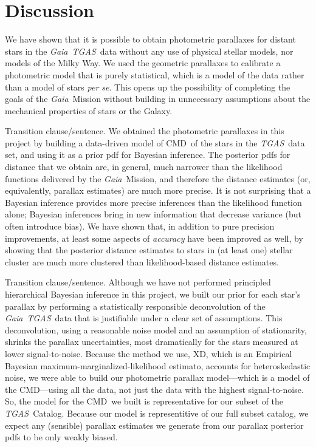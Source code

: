 \documentclass[modern]{aastex61}
\newcommand{\foreign}[1]{\textsl{#1}}
\newcommand{\acronym}[1]{{\small{#1}}}
\newcommand{\project}[1]{\textsl{#1}}
\newcommand{\tgas}{\project{\acronym{TGAS}}}
\newcommand{\gaia}{\project{Gaia}}
\newcommand{\xd}{\acronym{XD}}
\newcommand{\cmd}{\acronym{CMD}}
\begin{document}
\section{Discussion}

We have shown that it is possible to obtain photometric parallaxes for
distant stars in the \gaia\ \tgas\ data without any use of physical stellar
models, nor models of the Milky Way.
We used the geometric parallaxes to calibrate a photometric
model that is purely statistical, which is a model of the data rather than
a model of stars \foreign{per se}.
This opens up the possibility of completing the goals of the \gaia\ Mission
without building in unnecessary assumptions about the mechanical properties
of stars or the Galaxy.

Transition clause/sentence. We obtained the photometric parallaxes in this project
by building a data-driven model of \cmd\ of the stars in the \tgas\ data set,
and using it as a prior pdf for Bayesian inference.
The posterior pdfs for distance that we obtain are, in general, much
narrower than the likelihood functions delivered by the
\gaia\ Mission, and therefore the distance estimates (or,
equivalently, parallax estimates) are much more precise.
It is not surprising that a Bayesian inference provides more
precise inferences than the likelihood function alone; Bayesian
inferences bring in new information that decrease variance (but
often introduce bias).
We have shown that, in addition to pure precision improvements, at
least some aspects of \emph{accuracy} have been improved as well, by
showing that the posterior distance estimates to stars in (at least one) stellar
cluster are much more clustered than likelihood-based distance
estimates.

Transition clause/sentence. Although we have not performed principled hierarchical Bayesian inference in this
project, we built our prior for each star's parallax by
performing a statistically responsible deconvolution
of the \gaia\ \tgas\ data that is justifiable under a clear set of
assumptions.
This deconvolution, using a reasonable noise model and an
assumption of stationarity, shrinks the parallax uncertainties, most dramatically for the stars measured at lower signal-to-noise.
Because the method we use, \xd, which is
an Empirical Bayesian maximum-marginalized-likelihood estimato, accounts for
heteroskedastic noise, we were able to build our photometric parallax
model---which is a model of the \cmd---using
all the data, not just the data with the highest signal-to-noise.
So, the model for the \cmd\ we built is representative for
our subset of the \tgas\ Catalog.
Because our model is representitive of our full subset catalog, we expect any (sensible) parallax estimates
we generate from our parallax posterior pdfs to be only weakly biased.
\end{document}
